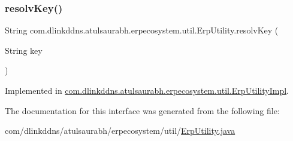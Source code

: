 \subsubsection{\texorpdfstring{resolv\+Key()}{resolvKey()}}
{\footnotesize\ttfamily String com.\+dlinkddns.\+atulsaurabh.\+erpecosystem.\+util.\+Erp\+Utility.\+resolv\+Key (\begin{DoxyParamCaption}\item[{String}]{key }\end{DoxyParamCaption})}



Implemented in \mbox{\hyperlink{classcom_1_1dlinkddns_1_1atulsaurabh_1_1erpecosystem_1_1util_1_1_erp_utility_impl_af2cfed2c5aca189be0e160b0610f2644}{com.\+dlinkddns.\+atulsaurabh.\+erpecosystem.\+util.\+Erp\+Utility\+Impl}}.



The documentation for this interface was generated from the following file\+:\begin{DoxyCompactItemize}
\item 
com/dlinkddns/atulsaurabh/erpecosystem/util/\mbox{\hyperlink{_erp_utility_8java}{Erp\+Utility.\+java}}\end{DoxyCompactItemize}
